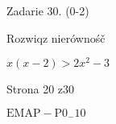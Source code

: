 \documentclass[a4paper,12pt]{article}
\begin{document}
Zadarie 30. (0-2)

Rozwiqz nierównośč

$x(x-2)>2x^{2}-3$

Strona 20 z30

$\mathrm{E}\mathrm{M}\mathrm{A}\mathrm{P}-\mathrm{P}0_{-}10$
\end{document}
